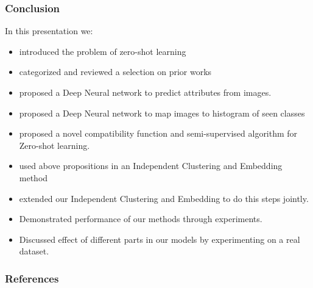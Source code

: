 \documentclass{beamer}
\begin{document}
\begin{frame}
  \frametitle{Conclusion}
  In this presentation we:
  \begin{itemize}
    \item introduced the problem of zero-shot learning
    \item categorized and reviewed a selection on prior works
    \item proposed a Deep Neural network to predict attributes from images.
    \item proposed a Deep Neural network to map images to histogram of seen classes
    \item proposed a novel compatibility function and semi-supervised algorithm for Zero-shot learning.
    \item used above propositions in an Independent Clustering and Embedding method
    \item extended our Independent Clustering and Embedding to do this steps jointly.
    \item Demonstrated performance of our methods through experiments.
    \item Discussed effect of different parts in our models by experimenting on a real dataset.
  \end{itemize}
\end{frame}
\begin{frame}[allowframebreaks]
        \frametitle{References}
        {\footnotesize
        
        
        }
\end{frame}
\end{document}
